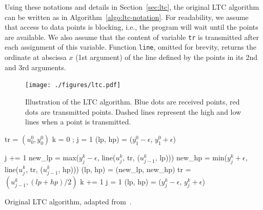 Using these notations and details in Section~\ref{sec:ltc}, the original LTC
algorithm can be written as in Algorithm~\ref{algo:ltc-notation}. For
readability, we assume that access to data points is blocking, i.e., the program
will wait until the points are available. We also assume that the content of
variable \texttt{tr} is transmitted after each assignment of this variable.
Function \texttt{line}, omitted for brevity, returns the ordinate at abscissa
$x$ (1st argument) of the line defined by the points in its 2nd and 3rd
arguments.

\begin{figure}[b]
\centering
\texttt{[image: ./figures/ltc.pdf]}
\caption{Illustration of the LTC algorithm. Blue 
dots are received points, red dots are transmitted points. Dashed lines 
represent the high and low lines when a point is 
transmitted.\vspace*{-0.3cm}}
\label{fig:ltc-notation}
\end{figure}

\begin{algorithm}
\begin{algorithmic}[1]
\Input
\EndInput
\Output
\EndOutput
\State tr = $(u^0_0, y^0_0)$ 
\State k = 0 ; j = 1
\State (lp, hp) = ($y^0_1 - \epsilon$, $y^0_1 + \epsilon$) 

 
    \State j += 1
    \State new\_lp = max($y^k_j-\epsilon$, line($u^k_j$, tr, ($u^k_{j-1}$, lp)))
    \State new\_hp = min($y^k_j+\epsilon$, line($u^k_j$, tr, ($u^k_{j-1}$, hp)))
     
        \State (lp, hp) = (new\_lp, new\_hp)
    \Else
        \State tr = $(u^k_{j-1}, (lp+hp)/2)$
        \State k += 1
        \State j = 1
        \State (lp, hp) = ($y^k_j-\epsilon$, $y^k_j+\epsilon$)
    \EndIf
\EndWhile
\end{algorithmic}
\caption{Original LTC algorithm, adapted from~\cite{schoellhammer2004lightweight}.}
\label{algo:ltc-notation}
\end{algorithm}


